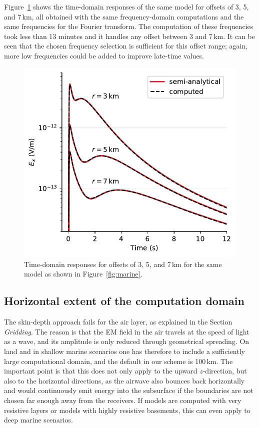 \documentclass[onecolumn,extra,referee,camera]{gji}
\newlength{\cwidth}
\begin{document}
Figure~\ref{fig:marine-multioffset} shows the time-domain responses of the same
model for offsets of 3, 5, and 7\,km, all obtained with the same
frequency-domain computations and the same frequencies for the Fourier
transform. The computation of these frequencies took less than 13 minutes and
it handles any offset between 3 and 7\,km. It can be seen that the chosen
frequency selection is sufficient for this offset range; again, more low
frequencies could be added to improve late-time values.
%
\begin{figure}
  \centering
  \includegraphics[width=\cwidth]{07-marine-multioffset}
  \caption{Time-domain responses for offsets of 3, 5, and 7\,km for the same
    model as shown in Figure~\ref{fig:marine}.}
  \label{fig:marine-multioffset}
\end{figure}
%


\subsection{Horizontal extent of the computation domain}  %

The skin-depth approach fails for the air layer, as explained in the Section
\emph{Gridding}. The reason is that the EM field in the air travels at the
speed of light as a wave, and its amplitude is only reduced through geometrical
spreading. On land and in shallow marine scenarios one has therefore to include
a sufficiently large computational domain, and the default in our scheme is
100\,km. The important point is that this does not only apply to the upward
$z$-direction, but also to the horizontal directions, as the airwave also
bounces back horizontally and would continuously emit energy into the
subsurface if the boundaries are not chosen far enough away from the receivers.
If models are computed with very resistive layers or models with highly
resistive basements, this can even apply to deep marine scenarios.
\end{document}
